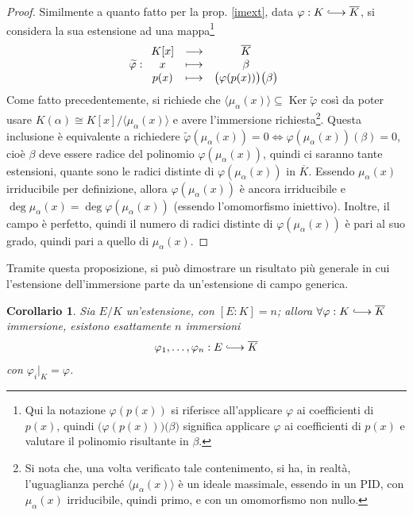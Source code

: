\documentclass[12pt]{scrartcl}
\theoremstyle{style}
\newtheorem{corollario}{Corollario}[teorema]
\numberwithin{equation}{subsection}
\newcommand{\longhookrightarrow}{\lhook\joinrel\longrightarrow}
\begin{document}
\begin{proof}
	Similmente a quanto fatto per la prop. \ref{imext}, data $\varphi :K\longhookrightarrow \overline{K}$, si considera la sua estensione ad una mappa\footnote{Qui la notazione $\varphi (p(x))$ si riferisce all'applicare $\varphi $ ai coefficienti di $p(x)$, quindi $\big(\varphi (p(x))\big)\big(\beta \big)$ significa applicare $\varphi $ ai coefficienti di $p(x)$ e valutare il polinomio risultante in $\beta $.}
	\[
		\widetilde{\varphi }:
		\begin{array}
			{c c c}
			K[x]& \longrightarrow & \overline{K}\\
			x & \longmapsto & \beta \\
			p(x) & \longmapsto & \big(\varphi (p(x))\big)\big(\beta \big)
		\end{array}
	\] 
	Come fatto precedentemente, si richiede che $\langle \mu _\alpha (x) \rangle \subseteq \operatorname{Ker} \widetilde{\varphi }$ cos\`i da poter usare $K(\alpha ) \cong K[x]  / \langle \mu _\alpha (x) \rangle$ e avere l'immersione richiesta\footnote{Si nota che, una volta verificato tale contenimento, si ha, in realt\`a, l'uguaglianza perch\'e $\langle \mu _\alpha (x) \rangle$ \`e un ideale massimale, essendo in un PID, con $\mu _\alpha (x)$ irriducibile, quindi primo, e con un omomorfismo non nullo.}.
	Questa inclusione \`e equivalente a richiedere $\widetilde{\varphi }(\mu _\alpha (x)) = 0 \iff \varphi (\mu _\alpha (x))(\beta ) = 0$, cio\`e $\beta $ deve essere radice del polinomio $\varphi (\mu _\alpha (x))$, quindi ci saranno tante estensioni, quante sono le radici distinte di $\varphi (\mu _\alpha (x))$ in $\overline{K}$.
	Essendo $\mu _\alpha (x)$ irriducibile per definizione, allora $\varphi (\mu _\alpha (x))$ \`e ancora irriducibile e $\deg \mu _\alpha (x) = \deg \varphi (\mu _\alpha (x))$ (essendo l'omomorfismo iniettivo).
	Inoltre, il campo \`e perfetto, quindi il numero di radici distinte di $\varphi (\mu _\alpha (x))$ \`e pari al suo grado, quindi pari a quello di $\mu _\alpha (x)$.
\end{proof}
\noindent Tramite questa proposizione, si pu\`o dimostrare un risultato pi\`u generale in cui l'estensione dell'immersione parte da un'estensione di campo generica.
\begin{corollario}\label{imext3}
	Sia $E / K$ un'estensione, con $[E:K] = n$; allora $\forall \varphi  : K \longhookrightarrow \overline{K}$ immersione, esistono esattamente $n$ immersioni
	\[
	\varphi _1,\ldots,\varphi _n : E \longhookrightarrow \overline{K}
	\] 
	con $\varphi _i|_K = \varphi $.
\end{corollario}
\end{document}
